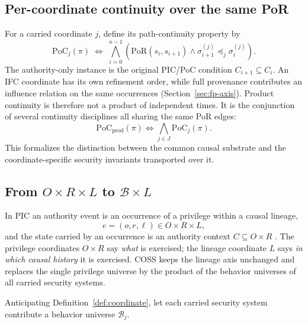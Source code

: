\documentclass[10pt,twocolumn]{article}
\newcommand{\Model}{\textnormal{\textsc{COSS}}\xspace}
\newcommand{\PoR}{\mathrm{PoR}}
\newcommand{\PoC}{\mathrm{PoC}}
\newcommand{\coord}{\sigma}
\begin{document}
\subsection{Per-coordinate continuity over the same PoR}
\label{sec:pocj}

For a carried coordinate $j$, define its path-continuity property by
\begin{equation}
 \PoC_j(\pi)
 \;\Longleftrightarrow\;
 \bigwedge_{i=0}^{n-1}
 \left(
   \PoR(s_i,s_{i+1})\land
   \coord_{i+1}^{(j)}\preceq_j\coord_i^{(j)}
 \right).
 \label{eq:pocj}
\end{equation}
The authority-only instance is the original PIC/PoC condition
$C_{i+1}\subseteq C_i$. An IFC coordinate has its own refinement order, while
full provenance contributes an influence relation on the same occurrences
(Section~\ref{sec:fp-axis}). Product continuity is therefore not a product of
independent times. It is the conjunction of several continuity disciplines all
sharing the same PoR edges:
\begin{equation}
  \PoC_{\mathrm{prod}}(\pi)
  \Longleftrightarrow
  \bigwedge_{j\in J}\PoC_j(\pi).
  \label{eq:pocprod}
\end{equation}
This formalizes the distinction between the common causal substrate and the
coordinate-specific security invariants transported over it.

\subsection{From \texorpdfstring{$O\times R\times L$}{O x R x L} to \texorpdfstring{$\mathcal{B}\times L$}{B x L}}
\label{sec:leap}

In PIC an authority event is an occurrence of a privilege within a
causal lineage,
\begin{equation}
  e=(o,r,\ell)\in O\times R\times L,
\end{equation}
and the state carried by an occurrence is an authority context
$C\subseteq O\times R$ \cite{gallo_poc2026}. The privilege coordinates
$O\times R$ say \emph{what} is exercised; the lineage coordinate $L$ says
\emph{in which causal history} it is exercised. \Model keeps the lineage
axis unchanged and replaces the single privilege universe by the product
of the behavior universes of all carried security systems.

Anticipating Definition~\ref{def:coordinate}, let each carried security
system contribute a behavior universe $\mathcal{B}_j$.
\end{document}
